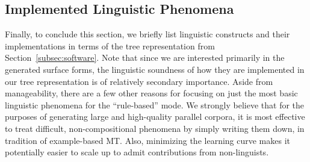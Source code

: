 {%












\subsection{Implemented Linguistic Phenomena}

Finally, to conclude this section, we briefly list linguistic constructs and their implementations in terms of the tree representation from Section~\ref{subsec:software}.
Note that since we are interested primarily in the generated surface forms, the linguistic soundness of how they are implemented in our tree representation is of relatively secondary importance.
Aside from manageability, there are a few other reasons for focusing on just the most basic linguistic phenomena for the ``rule-based'' mode.
We strongly believe that for the purposes of generating large and high-quality parallel corpora, it is most effective to treat difficult, non-compositional phenomena by simply writing them down, in tradition of example-based MT.
Also, minimizing the learning curve makes it potentially easier to scale up to admit contributions from non-linguists.



}
